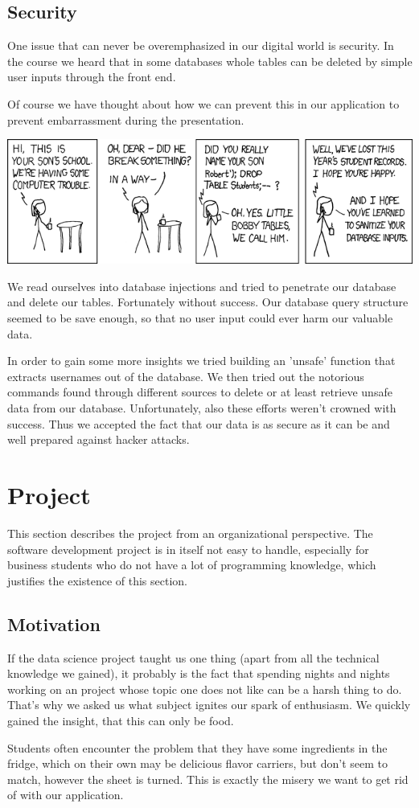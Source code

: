 \documentclass[11pt,a4paper,notitlepage]{article}
\begin{document}
\subsection*{Security}
One issue that can never be overemphasized in our digital world is security. In the course we heard that in some databases whole tables can be deleted by simple user inputs through the front end. \par Of course we have thought about how we can prevent this in our application to prevent embarrassment during the presentation. \par
\includegraphics[scale = .5]{exploits_of_a_mom.png} \par
We read ourselves into database injections and tried to penetrate our database and delete our tables. Fortunately without success. Our database query structure seemed to be save enough, so that no user input could ever harm our valuable data. \par In order to gain some more insights we tried building an 'unsafe' function that extracts usernames out of the database. We then tried out the notorious commands found through different sources to delete or at least retrieve unsafe data from our database. Unfortunately, also these efforts weren't crowned with success. Thus we accepted the fact that our data is as secure as it can be and well prepared against hacker attacks.

\newpage

\section*{Project}
This section describes the project from an organizational perspective. The software development project is in itself not easy to handle, especially for business students who do not have a lot of programming knowledge, which justifies the existence of this section.
\subsection*{Motivation}
If the data science project taught us one thing (apart from all the technical knowledge we gained), it probably is the fact that spending nights and nights working on an project whose topic one does not like can be a harsh thing to do. That's why we asked us what subject ignites our spark of enthusiasm. We quickly gained the insight, that this can only be food. \par Students often encounter the problem that they have some ingredients in the fridge, which on their own may be delicious flavor carriers, but don't seem to match, however the sheet is turned. This is exactly the misery we want to get rid of with our application.
\end{document}
